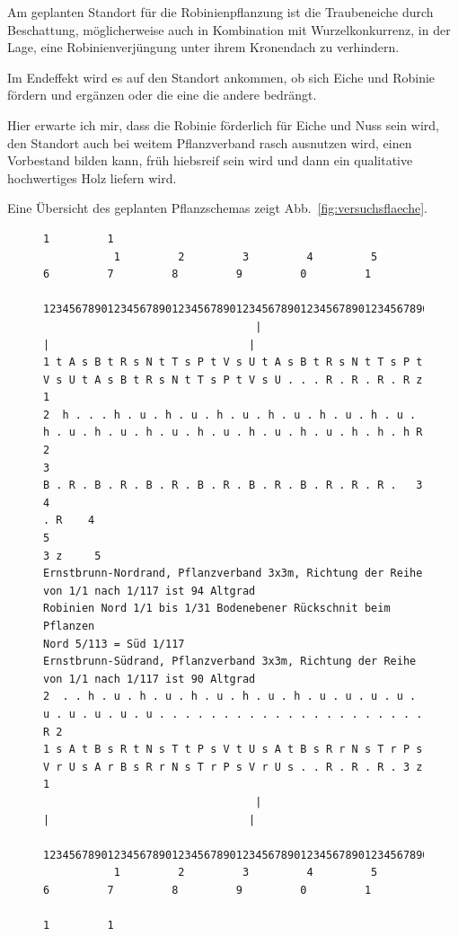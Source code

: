 \documentclass[twocolumn]{scrartcl}
\begin{document}
Am geplanten Standort für die Robinienpflanzung ist die Traubeneiche
durch Beschattung, möglicherweise auch in Kombination mit
Wurzelkonkurrenz, in der Lage, eine Robinienverjüngung unter ihrem
Kronendach zu verhindern.

Im Endeffekt wird es auf den Standort ankommen, ob sich Eiche und
Robinie fördern und ergänzen oder die eine die andere bedrängt.

Hier erwarte ich mir, dass die Robinie förderlich für Eiche und Nuss
sein wird, den Standort auch bei weitem Pflanzverband rasch ausnutzen
wird, einen Vorbestand bilden kann, früh hiebsreif sein wird und dann
ein qualitative hochwertiges Holz liefern wird.

Eine Übersicht des geplanten Pflanzschemas zeigt
Abb.~\ref{fig:versuchsflaeche}.

\begin{figure}[htb]
\begin{Verbatim}[fontsize=\footnotesize]
                                                                                                     1         1
           1         2         3         4         5         6         7         8         9         0         1
  123456789012345678901234567890123456789012345678901234567890123456789012345678901234567890123456789012345678901234567
                                 |                               |                               |
1 t A s B t R s N t T s P t V s U t A s B t R s N t T s P t V s U t A s B t R s N t T s P t V s U . . . R . R . R . R z 1
2  h . . . h . u . h . u . h . u . h . u . h . u . h . u . h . u . h . u . h . u . h . u . h . u . h . u . h . h . h R  2
3                                                             B . R . B . R . B . R . B . R . B . R . B . R . R . R .   3
4                                                                                                                . R    4
5                                                                                                               3 z     5
Ernstbrunn-Nordrand, Pflanzverband 3x3m, Richtung der Reihe von 1/1 nach 1/117 ist 94 Altgrad
Robinien Nord 1/1 bis 1/31 Bodenebener Rückschnit beim Pflanzen
Nord 5/113 = Süd 1/117
Ernstbrunn-Südrand, Pflanzverband 3x3m, Richtung der Reihe von 1/1 nach 1/117 ist 90 Altgrad
2  . . h . u . h . u . h . u . h . u . h . u . u . u . u . u . u . u . u . u . . . . . . . . . . . . . . . . . . . . . R 2
1 s A t B s R t N s T t P s V t U s A t B s R r N s T r P s V r U s A r B s R r N s T r P s V r U s . . R . R . R . 3 z  1
                                 |                               |                               |
  1234567890123456789012345678901234567890123456789012345678901234567890123456789012345678901234567890123456789012345678
           1         2         3         4         5         6         7         8         9         0         1
                                                                                                     1         1


\end{Verbatim}
\end{figure}
\end{document}
